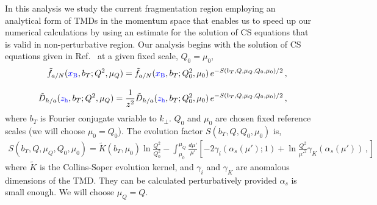 \documentclass[final,3p,times,onecolumn,sort&compress,hidelinks]{elsarticle}
\newcommand{\xbj}{\ensuremath{{\cbl x_{\rm B}}}}
\newcommand{\zh}{\ensuremath{{\cbl z_{\rm h}}}}
\newcommand\3[1]{\boldsymbol{#1}}
\newcommand{\cbl}{\color{blue}}
\begin{document}
 In this analysis we study the  current  fragmentation region employing  an analytical form of TMDs in the momentum space 
 that enables us  to speed up our numerical calculations by using 
 an estimate for the solution of CS equations that is valid in non-perturbative region. Our analysis begins with  the solution of CS equations given in Ref.~\cite{Collins:2014jpa} at a given fixed scale, $Q_0=\mu_0$,
\begin{eqnarray}
&&\tilde f_{a/N} (\xbj,b_T; Q^2, \mu_Q)= \tilde f_{a/N} (\xbj, b_T; Q_0^2, \mu_0)\,e^{-S(b_T, Q, \mu_Q, Q_0, \mu_0)/2}\,,
\label{e:PDF_ansatz}\\[0.3cm]
&&\tilde D_{h/a}(\zh,b_T; Q^2, \mu_Q)=\frac{1}{z^2}\tilde D_{h/a}(\zh, b_T; Q_0^2, \mu_0)\,e^{-S(b_T, Q, \mu_Q, Q_0, \mu_0)/2}\,,
\label{e:FF_ansatz0}
\end{eqnarray}
where $b_T$ is Fourier conjugate variable to $k_\perp$.   $Q_0$ and $\mu_0$ are chosen fixed reference scales (we will choose $\mu_0 = Q_0$).
The evolution factor  $S(b_T, Q, Q_0, \mu_0)$  is,
\begin{eqnarray}
S(b_T, Q, \mu_Q, Q_0, \mu_0) = \tilde K(b_T,\mu_0) \ln\frac{Q^2}{Q_0^2} - \int_{\mu_0}^{\mu_Q} \frac{d \mu'}{\mu'}\left[
-2 \gamma_i(\alpha_s(\mu');1) +\ln\frac{Q^2}{\mu'^2}\gamma_K(\alpha_s(\mu'))\,,
 \right]
 \label{e:FF_ansatz}
\end{eqnarray}
where $\tilde K$ is the Collins-Soper evolution kernel,  and
$\gamma_i$ and $\gamma_K$ are anomalous dimensions of the TMD. They  can be calculated perturbatively provided $\alpha_s$ is small enough. We will choose $\mu_Q = Q$. 
\end{document}
